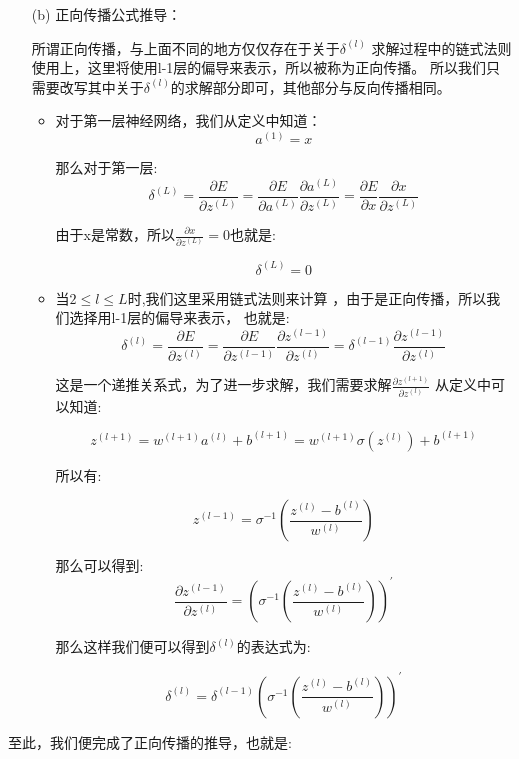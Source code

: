 \documentclass{homework}
\begin{document}
\begin{enumerate}
\begin{itemize}
\end{itemize}



	\item  [(b)] 正向传播公式推导：
	

	所谓正向传播，与上面不同的地方仅仅存在于关于$ \delta^{(l)}$
	求解过程中的链式法则使用上，这里将使用l-1层的偏导来表示，所以被称为正向传播。
	所以我们只需要改写其中关于$ \delta^{(l)}$的求解部分即可，其他部分与反向传播相同。

	
\begin{itemize}
	\item   对于第一层神经网络，我们从定义中知道：
	$$a^{(1)} = 
		x$$

	那么对于第一层:
	$$\delta^{(L)} = \frac{\partial E}{\partial z^{(L)}}
	= \frac{\partial E}{\partial a^{(L)}}
	\frac{\partial a^{(L)}}{\partial z^{(L)}} 
	= \frac{\partial E}{\partial x}
	\frac{\partial x}{\partial z^{(L)}} $$

	由于x是常数，所以$\frac{\partial x}{\partial z^{(L)}} = 0$也就是:

	$$\delta^{(L)} = 0 $$

   \item  当$2\leq l \leq L$时,我们这里采用链式法则来计算
   ，由于是正向传播，所以我们选择用l-1层的偏导来表示，
   也就是:
   $$\delta^{(l)}= 
   \frac{\partial E}{\partial z^{(l)}}
   =    \frac{\partial E}{\partial z^{(l-1)}}
   \frac{\partial z^{(l-1)}}{\partial z^{(l)}} 
   = \delta^{(l-1)} \frac{\partial z^{(l-1)}}{\partial z^{(l)}}  $$
   
   这是一个递推关系式，为了进一步求解，我们需要求解$\frac{\partial z^{(l+1)}}{\partial z^{(l)}} $
   从定义中可以知道:

   $$z^{(l+1)} =w^{(l+1)}a^{(l)} +b^{(l+1)}
   = w^{(l+1)}\sigma(z^{(l)}) +b^{(l+1)}$$

   所以有:

$$  z^{(l-1)} = \sigma^{-1}(\frac{z^{(l)}-b^{(l)}}{w^{(l)}})$$

那么可以得到:
   $$\frac{\partial z^{(l-1)}}{\partial z^{(l)}} = 
(\sigma^{-1}(\frac{z^{(l)}-b^{(l)}}{w^{(l)}}))^\prime$$

   那么这样我们便可以得到$\delta^{(l)}$的表达式为:

   $$\delta^{(l)} = 
   \delta^{(l-1)}(\sigma^{-1}(\frac{z^{(l)}-b^{(l)}}{w^{(l)}}))^\prime $$
\end{itemize}
	
\end{enumerate}

至此，我们便完成了正向传播的推导，也就是:
\end{document}
